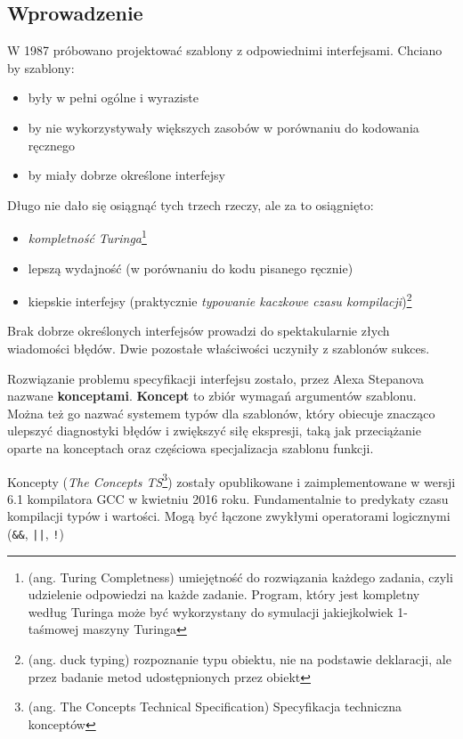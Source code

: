 \documentclass[11pt, a4paper]{article}
\begin{document}
\lstset{language=C++}

\subsection*{Wprowadzenie}
W 1987 próbowano projektować szablony z odpowiednimi interfejsami. Chciano by szablony:

\begin{itemize}

\item były w pełni ogólne i wyraziste
\item by nie wykorzystywały większych zasobów w porównaniu do kodowania ręcznego
\item by miały dobrze określone interfejsy

\end{itemize}

\noindent Długo nie dało się osiągnąć tych trzech rzeczy, ale za to osiągnięto:

\begin{itemize}

\item \emph{kompletność Turinga}\footnote{(ang. Turing Completness) umiejętność do rozwiązania każdego zadania, czyli udzielenie odpowiedzi na każde zadanie. Program, który jest kompletny według Turinga może być wykorzystany do symulacji jakiejkolwiek 1-taśmowej maszyny Turinga}
\item lepszą wydajność (w porównaniu do kodu pisanego ręcznie)
\item kiepskie interfejsy (praktycznie \emph{typowanie kaczkowe czasu kompilacji})\footnote{(ang. duck typing) rozpoznanie typu obiektu, nie na podstawie deklaracji, ale przez badanie metod udostępnionych przez obiekt}

\end{itemize}

Brak dobrze określonych interfejsów prowadzi do spektakularnie złych wiadomości błędów. Dwie pozostałe właściwości uczyniły z szablonów sukces.

Rozwiązanie problemu specyfikacji interfejsu zostało, przez Alexa Stepanova nazwane \textbf{konceptami}. \textbf{Koncept} to zbiór wymagań argumentów szablonu. Można też go nazwać systemem typów dla szablonów, który obiecuje znacząco ulepszyć diagnostyki błędów i zwiększyć siłę ekspresji, taką jak przeciążanie oparte na konceptach oraz częściowa specjalizacja szablonu funkcji.

Koncepty (\emph{The Concepts TS}\footnote{(ang. The Concepts Technical Specification) Specyfikacja techniczna konceptów}) zostały opublikowane i zaimplementowane w wersji 6.1 kompilatora GCC w kwietniu 2016 roku. Fundamentalnie to predykaty czasu kompilacji typów i wartości. Mogą być łączone zwykłymi operatorami logicznymi (\verb#&&#, \verb#||#, \verb#!#)

\end{document}
